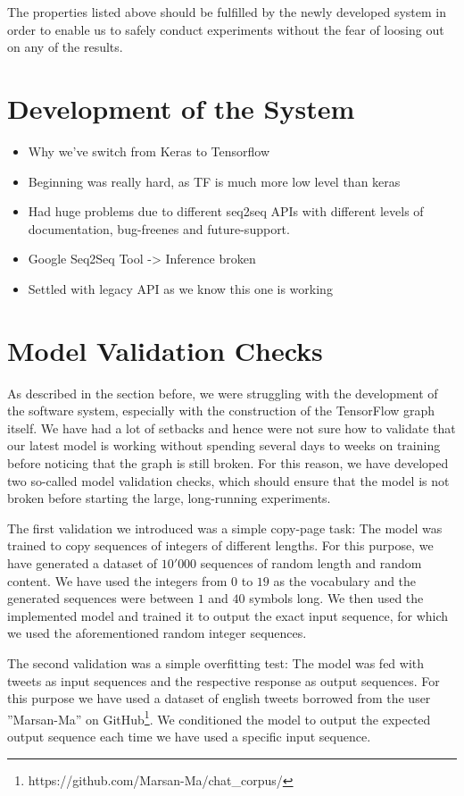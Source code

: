 The properties listed above should be fulfilled by the newly developed system in order to enable us to safely conduct experiments without the fear of loosing out on any of the results.

\section{Development of the System}
\begin{itemize}
	\item Why we've switch from Keras to Tensorflow
	\item Beginning was really hard, as TF is much more low level than keras
	\item Had huge problems due to different seq2seq APIs with different levels of documentation, bug-freenes and future-support.
	\item Google Seq2Seq Tool -> Inference broken
	\item Settled with legacy API as we know this one is working
\end{itemize}
\section{Model Validation Checks}
\label{software_sytem:model_validation_checks}
As described in the section before, we were struggling with the development of the software system, especially with the construction of the TensorFlow graph itself. We have had a lot of setbacks and hence were not sure how to validate that our latest model is working without spending several days to weeks on training before noticing that the graph is still broken. For this reason, we have developed two so-called model validation checks, which should ensure that the model is not broken before starting the large, long-running experiments.

The first validation we introduced was a simple copy-page task: The model was trained to copy sequences of integers of different lengths. For this purpose, we have generated a dataset of $10'000$ sequences of random length and random content. We have used the integers from $0$ to $19$ as the vocabulary and the generated sequences were between $1$ and $40$ symbols long. We then used the implemented model and trained it to output the exact input sequence, for which we used the aforementioned random integer sequences. 

The second validation was a simple overfitting test: The model was fed with tweets as input sequences and the respective response as output sequences. For this purpose we have used a dataset of english tweets borrowed from the user ''Marsan-Ma'' on GitHub\footnote{https://github.com/Marsan-Ma/chat\_corpus/}. We conditioned the model to output the expected output sequence each time we have used a specific input sequence.

